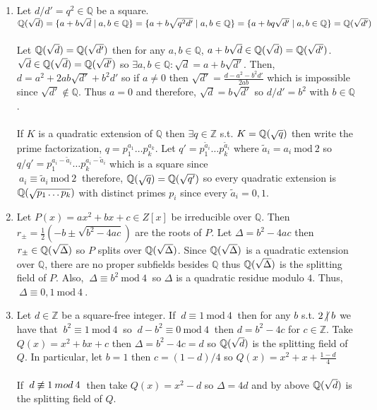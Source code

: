 \documentclass[12pt]{extarticle}
\newcommand{\ndivides}{\centernot \mid}
\newcommand{\Z}{\mathbb{Z}}
\newcommand{\Q}{\mathbb{Q}}
\renewcommand{\mod}[3]{\: #1 \equiv #2 \: \mathrm{mod} \: #3 \:}
\newcommand{\nmod}[3]{\: #1 \centernot \equiv #2 \: mod \: #3 \:}
\newcommand{\quadfield}[1]{\Q \small(\sqrt{#1} \small)}
\begin{document}
\begin{enumerate}
\begin{enumerate}
\item Let $d/d' = q^2 \in \Q$ be a square. $\quadfield{d} = \{a + b\sqrt{d} \mid a,b \in \Q \} = \\ \{ a + b \sqrt{q^2 d'} \mid a, b \in \Q\} = \{ a + bq \sqrt{d'} \mid a, b \in \Q\} = \quadfield{d'}$ \\ \\
Let $\quadfield{d} = \quadfield{d'}$ then for any $a,b \in \Q$, $a + b\sqrt{d} \in \quadfield{d} = \quadfield{d'}$. $\sqrt{d} \in \quadfield{d} = \quadfield{d'}$ so $\exists a,b \in \Q : \sqrt{d} = a+b\sqrt{d'}$. Then, $d = a^2 + 2ab\sqrt{d'} + b^2 d'$ so if $a \neq 0$ then $\sqrt{d'} = \frac{d - a^2 - b^2 d'}{2ab}$ which is impossible since $\sqrt{d'} \notin \Q$. Thus $a = 0$ and therefore, $\sqrt{d} = b \sqrt{d'}$ so $d/d' = b^2$ with $b \in \Q$. \\ \\
If $K$ is a quadratic extension of $\Q$ then $\exists q \in \Z$ s.t. $K = \quadfield{q}$ then write the prime factorization, $q = p_1^{a_1} \dots p_k^{a_k}$. Let $q' = p_1^{\tilde{a}_i} \dots p_k^{\tilde{a}_i}$ where $\tilde{a}_i = a_i \: \textrm{mod} \: 2$ so $q/q' = p_1^{a_i - \tilde{a}_i} \dots p_k^{a_i - \tilde{a}_i}$ which is a square since \\ $\mod{a_i}{\tilde{a}_i}{2}$ therefore, $\quadfield{q} = \quadfield{q'}$ so every quadratic extension is $\quadfield{p_1 \dots p_k}$ with distinct primes $p_i$ since every $\tilde{a}_i = 0,1$.   
\\
\item Let $P(x) = ax^2 + bx + c \in Z[x]$ be irreducible over $\Q$. Then $r_{\pm} = \frac{1}{2}(-b \pm \sqrt{b^2 - 4ac})$ are the roots of $P$. Let $\Delta = b^2 - 4ac$ then $r_{\pm} \in \quadfield{\Delta}$ so $P$ splits over $\quadfield{\Delta}$. Since $\quadfield{\Delta}$ is a quadratic extension over $\Q$, there are no proper subfields besides $\Q$ thus $\quadfield{\Delta}$ is the splitting field of $P$. Also,
$\mod{\Delta}{b^2}{4}$ so $\Delta$ is a quadratic residue modulo $4$. Thus, $\mod{\Delta}{0, 1}{4}$. 

\item Let $d \in \Z$ be a square-free integer. If $\mod{d}{1}{4}$ then for any $b$ s.t. $2 \ndivides b$ we have that $\mod{b^2}{1}{4}$ so $\mod{d - b^2}{0}{4}$ then $d = b^2 - 4c$ for $c \in \Z$. Take $Q(x) = x^2 + bx + c$ then $\Delta = b^2 - 4c = d$ so $\quadfield{d}$ is the splitting field of $Q$. In particular, let $b = 1$ then $c = (1-d)/4$ so $Q(x) = x^2 + x + \frac{1-d}{4}$ \\ \\
If $\nmod{d}{1}{4}$ then take $Q(x) = x^2 - d$ so $\Delta = 4d$ and by above $\quadfield{d}$ is the splitting field of $Q$. 

\end{enumerate}

\end{enumerate}
\end{document}
